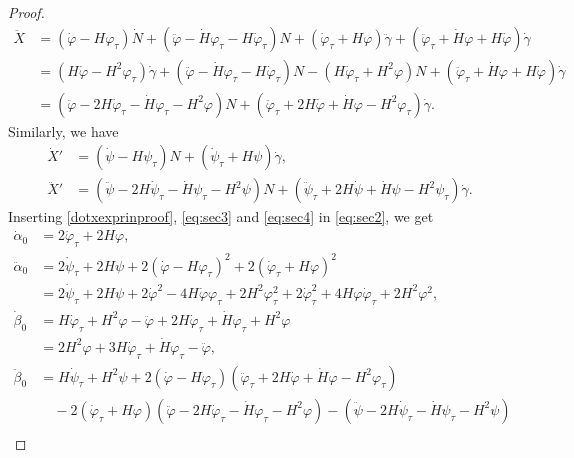 \documentclass[11pt]{amsart}
\theoremstyle{definition}
\theoremstyle{remark}
\numberwithin{equation}{section}
\begin{document}
\begin{proof}
\begin{equation}
	\begin{split}
		\ddot X&=\left(\dot\varphi-H\varphi_\tau\right)\dot N+\left(\ddot\varphi-\dot H\varphi_\tau-H\dot \varphi_\tau\right)N+\left(\dot\varphi_\tau+H\varphi\right)\ddot\gamma+\left(\ddot\varphi_\tau+\dot H\varphi+H\dot\varphi\right)\dot\gamma\\
		&=\left(H\dot\varphi-H^2\varphi_\tau\right)\dot \gamma+\left(\ddot\varphi-\dot H\varphi_\tau-H\dot \varphi_\tau\right)N-\left(H\dot\varphi_\tau+H^2\varphi\right)N+\left(\ddot\varphi_\tau+\dot H\varphi+H\dot\varphi\right)\dot\gamma\\
		&=\left(\ddot\varphi-2H\dot \varphi_\tau-\dot H\varphi_\tau-H^2\varphi\right)N+\left(\ddot\varphi_\tau+2H\dot\varphi+\dot H\varphi-H^2\varphi_\tau\right)\dot\gamma.
	\end{split}
\end{equation}
Similarly, we have 
\begin{equation}\label{eq:sec4}
	\begin{split}
		\dot X'&=\left(\dot\psi-H\psi_\tau\right)N+\left(\dot\psi_\tau+H\psi\right)\dot\gamma,\\
		\ddot X'&=\left(\ddot\psi-2H\dot \psi_\tau-\dot H\psi_\tau-H^2\psi\right)N+\left(\ddot\psi_\tau+2H\dot\psi+\dot H\psi-H^2\psi_\tau\right)\dot\gamma.
	\end{split}
\end{equation}
Inserting \eqref{dotxexprinproof}, \eqref{eq:sec3} and \eqref{eq:sec4} in \eqref{eq:sec2}, we get
\begin{align*}
	\dot\alpha_0&=2\dot\varphi_\tau+2H\varphi,\\
	\ddot\alpha_0&=2\dot\psi_\tau+2H\psi+2\left(\dot\varphi-H\varphi_\tau\right)^2+2\left(\dot\varphi_\tau+H\varphi\right)^2\\
	&=2\dot\psi_\tau+2H\psi+2\dot\varphi^2-4H\dot\varphi\varphi_\tau+2H^2\varphi_\tau^2+2\dot\varphi_\tau^2+4H\varphi\dot\varphi_\tau+2H^2\varphi^2,\\
	\dot\beta_0&=H\dot\varphi_\tau+H^2\varphi-\ddot\varphi+2H\dot\varphi_\tau+\dot H\varphi_\tau+H^2\varphi\\
	&=2H^2\varphi+3H\dot\varphi_\tau+\dot H\varphi_\tau-\ddot\varphi,\\
	\ddot\beta_0&=H\dot\psi_\tau+H^2\psi+2\left(\dot\varphi-H\varphi_\tau\right)\left(\ddot\varphi_\tau+2H\dot\varphi+\dot H\varphi-H^2\varphi_\tau\right)\\
	&\quad-2\left(\dot\varphi_\tau+H\varphi\right)\left(\ddot\varphi-2H\dot \varphi_\tau-\dot H\varphi_\tau-H^2\varphi\right)-\left(\ddot\psi-2H\dot \psi_\tau-\dot H\psi_\tau-H^2\psi\right)\\

\end{align*}
\end{proof}
\end{document}
